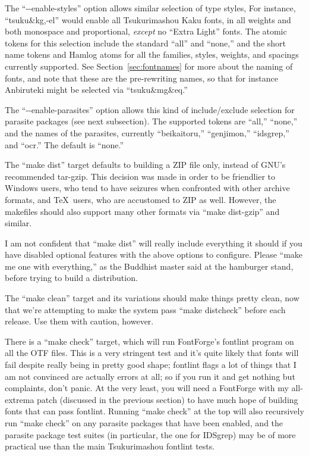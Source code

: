 \documentclass[14pt]{extarticle}
\begin{document}
The ``-{}-enable-styles'' option allows similar selection of type styles,
For instance, ``tsuku\&kg,-el'' would enable all
Tsukurimashou Kaku fonts, in all weights and both monospace and
proportional, \emph{except} no ``Extra Light'' fonts.  The atomic tokens for
this selection include the standard ``all'' and ``none,'' and the short
name tokens and Hamlog atoms for all the families, styles, weights, and
spacings currently supported.  See Section~\ref{sec:fontnames} for more
about the naming of fonts, and note that these are the pre-rewriting names,
so that for instance Anbiruteki might be selected via ``tsuku\&mg\&eq.''

The ``-{}-enable-parasites'' option allows this kind of include/exclude
selection for parasite packages (see next subsection).  The supported tokens
are ``all,'' ``none,'' and the names of the parasites, currently
``beikaitoru,'' ``genjimon,'' ``idsgrep,'' and ``ocr.''
The default is ``none.''

The ``make dist'' target defaults to building a ZIP file only, instead of
GNU's recommended tar-gzip.  This decision was made in order to be
friendlier to Windows users, who tend to have seizures when confronted with
other archive formats, and \TeX\ users, who are accustomed to ZIP as well. 
However, the makefiles should also support many other formats via ``make
dist-gzip'' and similar.

I am not confident that ``make dist'' will really include everything it
should if you have disabled optional features with the above options to
configure.  Please ``make me one with everything,'' as the Buddhist master
said at the hamburger stand, before trying to build a distribution.

The ``make clean'' target and its variations should make things pretty
clean, now that we're attempting to make the system pass ``make distcheck''
before each release.  Use them with caution, however.

There is a ``make check'' target, which will run FontForge's fontlint
program on all the OTF files.  This is a very stringent test and it's quite
likely that fonts will fail despite really being in pretty good shape;
fontlint flags a lot of things that I am not convinced are actually errors
at all; so if you run it and get nothing but complaints, don't panic.  At
the very least, you will need a FontForge with my all-extrema patch
(discussed in the previous section) to have much hope of building fonts that
can pass fontlint.  Running ``make check'' at the top will also recursively
run ``make check'' on any parasite packages that have been enabled, and the
parasite package test suites (in particular, the one for IDSgrep) may be of
more practical use than the main Tsukurimashou fontlint tests.
\end{document}
